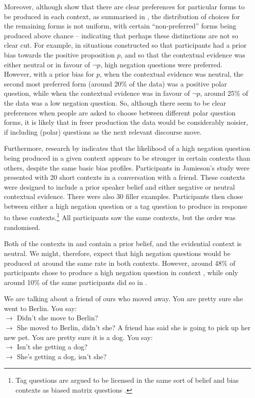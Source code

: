 \documentclass[output=paper,colorlinks,citecolor=brown]{langscibook}
\begin{document}
Moreover, although \citet{domaneschi_bias_2017} show that there are clear preferences for particular forms to be produced in each context, as summarised in , the distribution of choices for the remaining forms is not  uniform, with certain ``non-preferred'' forms being produced above chance  --  indicating that perhaps these distinctions are not so clear cut. For example, in situations constructed so that participants had a prior bias towards the positive proposition $p$, and so that the contextual evidence was either neutral or in favour of $\neg p$, high negation questions were preferred. However, with a prior bias for $p$, when the contextual evidence was neutral, the second most preferred form (around 20\% of the data) was a positive polar question, while when the contextual evidence was in favour of $\neg p$, around 25\% of the data was a low negation question. So, although there seem to be clear preferences when people are asked to choose between different polar question forms, it is likely that in freer production the data would be considerably noisier, if including (polar) questions as the next relevant discourse move.

Furthermore, research by \citet{jamieson_experimental_2018} indicates that the likelihood of a high negation question being produced in a given context appears to be stronger in certain contexts than others, despite the same basic bias profiles. Participants in Jamieson's study were presented with 20 short contexts in a conversation with a friend. These contexts were designed to include a prior speaker belief and either negative or neutral contextual evidence. There were also 30 filler examples. Participants then chose between either a high negation question or a tag question to produce in response to these contexts.\footnote{Tag questions are argued to be licensed in the same sort of belief and bias contexts as biased matrix questions \citep{ladd_first_1981, reese_prosody_2006, malamud_three_2014, krifka_bias_2015}.} All participants saw the same contexts, but the order was randomised.

Both of the contexts in  and  contain a prior belief, and the evidential context is neutral. We might, therefore, expect that high negation questions would be produced at around the same rate in both contexts. However, around 48\% of participants chose to produce a high negation question in context , while only around 10\% of the same participants did so in .

\begin{exe}
\ex \label{berlin} We are talking about a friend of ours who moved away. You are pretty sure she went to Berlin. You say:\\
$\longrightarrow$ Didn't she move to Berlin?\\
$\longrightarrow$ She moved to Berlin, didn't she?
\ex \label{dog} A friend has said she is going to pick up her new pet. You are pretty sure it is a dog. You say:\\
$\longrightarrow$ Isn't she getting a dog?\\
$\longrightarrow$ She's getting a dog, isn't she?
\end{exe}
\end{document}
